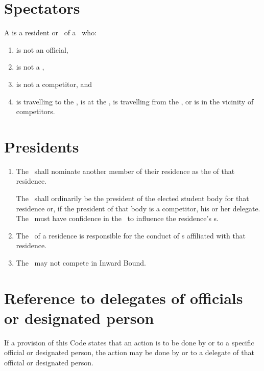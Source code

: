 \documentclass[12pt]{report}
\begin{document}
  \section{Spectators}
  \begin{fenumerate}
    \item A  is a resident or \exresident\ of a \residence\ who:
    \begin{enumerate}
      \item is not an official,
      \item is not a \Captain,
      \item is not a competitor, and
      \item is travelling to the \Endpoint, is at the \Endpoint, is travelling from the \Endpoint, or is in the vicinity of competitors.
    \end{enumerate}
  \end{fenumerate}
  \section{Presidents}
  \begin{enumerate}
    \item The \Coach\ shall nominate another member of their residence as the  of that residence.

    The \President\ shall ordinarily be the president of the elected student body for that residence or, if the president of that body is a competitor, his or her delegate. The \Captain\ must have confidence in the \President\ to influence the residence's \spectator s.
    \item The \President\ of a residence is responsible for the conduct of \spectator s affiliated with that residence.
    \item The \President\ may not compete in Inward Bound.
  \end{enumerate}
  \section{Reference to delegates of officials or designated person}
  \begin{fenumerate}
\item  If a provision of this Code states that an action is to be done by or to a specific official or designated person, the action may be done by or to a delegate of that official or designated person.
\end{fenumerate}
\end{document}
